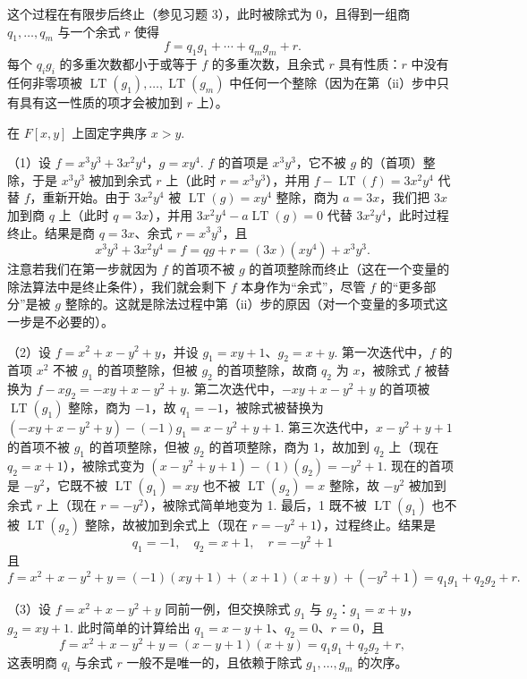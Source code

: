 这个过程在有限步后终止（参见习题 3），此时被除式为 0，且得到一组商 \(q_1, \ldots, q_m\) 与一个余式 \(r\) 使得
\[
f = q_1g_1 + \cdots + q_mg_m + r.
\]
每个 \(q_ig_i\) 的多重次数都小于或等于 \(f\) 的多重次数，且余式 \(r\) 具有性质：\(r\) 中没有任何非零项被 \(\operatorname{LT}(g_1), \ldots, \operatorname{LT}(g_m)\) 中任何一个整除（因为在第（ii）步中只有具有这一性质的项才会被加到 \(r\) 上）。

\begin{example}
在 \(F[x, y]\) 上固定字典序 \(x > y\).

（1）设 \(f = x^3y^3+3x^2y^4\)，\(g = xy^4\). \(f\) 的首项是 \(x^3y^3\)，它不被 \(g\) 的（首项）整除，于是 \(x^3y^3\) 被加到余式 \(r\) 上（此时 \(r = x^3y^3\)），并用 \(f-\operatorname{LT}(f) = 3x^2y^4\) 代替 \(f\)，重新开始。由于 \(3x^2y^4\) 被 \(\operatorname{LT}(g) = xy^4\) 整除，商为 \(a = 3x\)，我们把 \(3x\) 加到商 \(q\) 上（此时 \(q = 3x\)），并用 \(3x^2y^4-a\operatorname{LT}(g) = 0\) 代替 \(3x^2y^4\)，此时过程终止。结果是商 \(q = 3x\)、余式 \(r = x^3y^3\)，且
\[
x^3y^3+3x^2y^4 = f = qg+r = (3x)(xy^4) + x^3y^3.
\]
注意若我们在第一步就因为 \(f\) 的首项不被 \(g\) 的首项整除而终止（这在一个变量的除法算法中是终止条件），我们就会剩下 \(f\) 本身作为“余式”，尽管 \(f\) 的“更多部分”是被 \(g\) 整除的。这就是除法过程中第（ii）步的原因（对一个变量的多项式这一步是不必要的）。

（2）设 \(f = x^2+x-y^2+y\)，并设 \(g_1 = xy+1\)、\(g_2 = x+y\). 第一次迭代中，\(f\) 的首项 \(x^2\) 不被 \(g_1\) 的首项整除，但被 \(g_2\) 的首项整除，故商 \(q_2\) 为 \(x\)，被除式 \(f\) 被替换为 \(f-xg_2 = -xy+x-y^2+y\). 第二次迭代中，\(-xy+x-y^2+y\) 的首项被 \(\operatorname{LT}(g_1)\) 整除，商为 \(-1\)，故 \(q_1 = -1\)，被除式被替换为 \((-xy+x-y^2+y)-(-1)g_1 = x-y^2+y+1\). 第三次迭代中，\(x-y^2+y+1\) 的首项不被 \(g_1\) 的首项整除，但被 \(g_2\) 的首项整除，商为 1，故加到 \(q_2\) 上（现在 \(q_2 = x+1\)），被除式变为 \((x-y^2+y+1)-(1)(g_2) = -y^2+1\). 现在的首项是 \(-y^2\)，它既不被 \(\operatorname{LT}(g_1) = xy\) 也不被 \(\operatorname{LT}(g_2) = x\) 整除，故 \(-y^2\) 被加到余式 \(r\) 上（现在 \(r = -y^2\)），被除式简单地变为 1. 最后，1 既不被 \(\operatorname{LT}(g_1)\) 也不被 \(\operatorname{LT}(g_2)\) 整除，故被加到余式上（现在 \(r = -y^2+1\)），过程终止。结果是
\[
q_1 = -1, \quad q_2 = x+1, \quad r = -y^2+1
\]
且
\[
f = x^2+x-y^2+y = (-1)(xy+1)+(x+1)(x+y)+(-y^2+1) = q_1g_1+q_2g_2+r.
\]

（3）设 \(f = x^2+x-y^2+y\) 同前一例，但交换除式 \(g_1\) 与 \(g_2\)：\(g_1 = x+y\)，\(g_2 = xy+1\). 此时简单的计算给出 \(q_1 = x-y+1\)、\(q_2 = 0\)、\(r = 0\)，且
\[
f = x^2+x-y^2+y = (x-y+1)(x+y) = q_1g_1+q_2g_2+r,
\]
这表明商 \(q_i\) 与余式 \(r\) 一般不是唯一的，且依赖于除式 \(g_1, \ldots, g_m\) 的次序。
\end{example}

